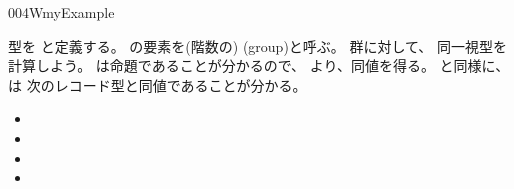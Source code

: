 \documentclass[index]{subfiles}
\begin{document}
\begin{myBlock}{004W}{myExample}
\begin{itemize}
  \end{itemize}
  型を
  と定義する。
  の要素を(階数の)
  (group)と呼ぶ。
  群に対して、
  同一視型を計算しよう。
  は命題であることが分かるので、
  より、同値を得る。
  と同様に、
  は
  次のレコード型と同値であることが分かる。
  \begin{itemize}
  \item {}
  \item {}
  \item {}
  \item {}
  \end{itemize}
\end{myBlock}
\end{document}
